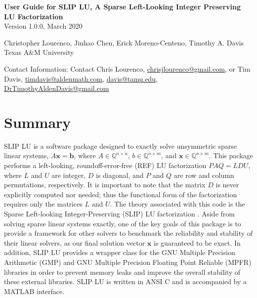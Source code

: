 \documentclass[12pt]{article}
\theoremstyle{definition}
\begin{document}
\begin{center}
\begin{large}
\textbf{User Guide for SLIP LU, A Sparse Left-Looking Integer
Preserving LU Factorization} \\
\vspace{5mm}
Version 1.0.0, March 2020 %
\vspace{20mm}

Christopher Lourenco, Jinhao Chen, Erick Moreno-Centeno, Timothy A. Davis \\

Texas A\&M University

\vspace{20mm}
Contact Information: Contact Chris Lourenco, \href{mailto:chrisjlourenco@gmail.com}{chrisjlourenco@gmail.com}, or Tim Davis,
\href{mailto:timdavis@aldenmath.com}{timdavis@aldenmath.com},
\href{mailto:davis@tamu.edu}{davis@tamu.edu},
\href{DrTimothyAldenDavis@gmail.com}{DrTimothyAldenDavis@gmail.com}

\end{large}
\end{center}

\newpage

{
\small
\hypersetup{ linkcolor = black}
\tableofcontents
}
\newpage

\section{Summary}
\label{s:intro}

SLIP LU is a software package designed to exactly solve unsymmetric sparse
linear systems, $ A \mathbf{x} = \mathbf{b}$, where $A \in \mathbb{Q}^{n \times
n}$, $b \in \mathbb{Q}^{n \times m}$, and $\mathbf{x} \in \mathbb{Q}^{n \times
m}$. This package performs a left-looking, roundoff-error-free (REF) LU
factorization $P A Q = L D U$, where $L$ and $U$ are integer, $D$ is diagonal,
and $P$ and $Q$ are row and column permutations, respectively. It is important
to note that the matrix $D$ is never explicitly computed nor needed; thus the
functional form of the factorization requires only the matrices $L$ and $U$.
The theory associated with this code is the Sparse Left-looking
Integer-Preserving (SLIP) LU factorization \cite{lourenco2019exact}. Aside from
solving sparse linear systems exactly, one of the key goals of this package is
to provide a framework for other solvers to benchmark the reliability and
stability of their linear solvers, as our final solution vector $\mathbf{x}$ is
guaranteed to be exact. In addition, SLIP LU provides a wrapper class for the
GNU Multiple Precision Arithmetic (GMP) \cite{granlund2015gnu} and GNU Multiple
Precision Floating Point Reliable (MPFR) \cite{fousse2007mpfr} libraries in
order to prevent memory leaks and improve the overall stability of these
external libraries. SLIP LU is written in ANSI C and is accompanied by a MATLAB
interface.
\end{document}

